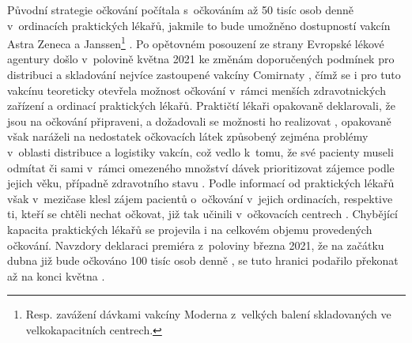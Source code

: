 
Původní strategie očkování počítala s~očkováním až 50 tisíc osob denně v~ordinacích praktických lékařů, jakmile to bude umožněno dostupností vakcín Astra Zeneca a Janssen\footnote{Resp. zavážení dávkami vakcíny Moderna z~velkých balení skladovaných ve velkokapacitních centrech.} \cite{strategie_covid}. Po opětovném posouzení ze strany Evropské lékové agentury došlo v~polovině května 2021 ke změnám doporučených podmínek pro distribuci a skladování nejvíce zastoupené vakcíny Comirnaty \cite{logoc_pfizer_mrazak}, čímž se i pro tuto vakcínu teoreticky otevřela možnost očkování v~rámci menších zdravotnických zařízení a ordinací praktických lékařů. %
Praktičtí lékaři opakovaně deklarovali, že jsou na očkování připraveni, a dožadovali se možnosti ho realizovat \cite{logoc_svl,logoc_pripravenost}, opakovaně však naráželi na nedostatek očkovacích látek způsobený zejména problémy v~oblasti distribuce a logistiky vakcín, což vedlo k~tomu, že své pacienty museli odmítat či sami v~rámci omezeného množství dávek prioritizovat zájemce podle jejich věku, případně zdravotního stavu \cite{logo_logistika}. 
%
Podle informací od praktických lékařů však v~mezičase klesl zájem pacientů o~očkování v~jejich ordinacích, respektive ti, kteří se chtěli nechat očkovat, již tak učinili v~očkovacích centrech \cite{logo_praktici}. 
%
Chybějící kapacita praktických lékařů se projevila i na celkovém objemu provedených očkování. Navzdory deklaraci premiéra z~poloviny března 2021, že na začátku dubna již bude očkováno 100 tisíc osob denně \cite{logoc_100k}, se tuto hranici podařilo překonat až na konci května \cite{logoc_100kmame}. %




